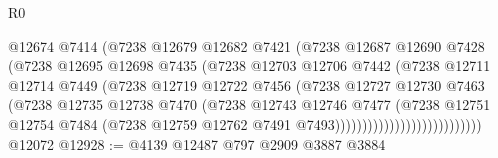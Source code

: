 \begin{lexlean}{R0}
\begin{coremodule}
                                    @12674
                                    @7414
                                    (@7238
                                      @12679
                                      @12682
                                      @7421
                                      (@7238
                                        @12687
                                        @12690
                                        @7428
                                        (@7238
                                          @12695
                                          @12698
                                          @7435
                                          (@7238
                                            @12703
                                            @12706
                                            @7442
                                            (@7238
                                              @12711
                                              @12714
                                              @7449
                                              (@7238
                                                @12719
                                                @12722
                                                @7456
                                                (@7238
                                                  @12727
                                                  @12730
                                                  @7463
                                                  (@7238
                                                    @12735
                                                    @12738
                                                    @7470
                                                    (@7238
                                                      @12743
                                                      @12746
                                                      @7477
                                                      (@7238
                                                        @12751
                                                        @12754
                                                        @7484
                                                        (@7238
                                                          @12759
                                                          @12762
                                                          @7491
                                                          @7493)))))))))))))))))))))))))))
    @12072
@12928 := @4139 @12487 @797 @2909 @3887 @3884

\end{coremodule}
\end{lexlean}
